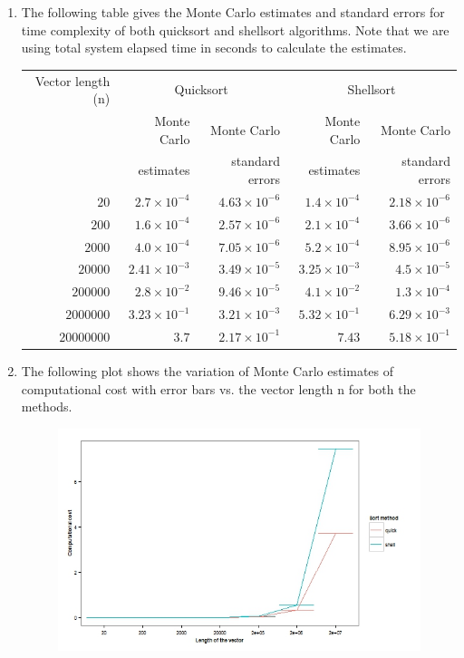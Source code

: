 \documentclass[12pt]{article}
\begin{document}
\begin{enumerate}[label=(\alph*)]
\item The following table gives the Monte Carlo estimates and standard errors for time complexity of both quicksort and shellsort algorithms. Note that we are using total system elapsed time in seconds to calculate the estimates. 
\FloatBarrier
\begin{table}[!htb]
\centering
\begin{tabular}{rrrrr}
  \hline
Vector length (n) & \multicolumn{2}{c}{Quicksort} & \multicolumn{2}{c}{Shellsort}\\ & Monte Carlo & Monte Carlo & Monte Carlo & Monte Carlo \\& estimates & standard errors & estimates & standard errors\\ 
  \hline
$20$ & $2.7\times 10^{-4}$ & $4.63\times 10^{-6}$ & $1.4\times 10^{-4}$ & $2.18\times 10^{-6}$ \\ 
$200$ & $1.6\times 10^{-4}$ & $2.57\times 10^{-6}$ & $2.1\times 10^{-4}$ & $3.66\times 10^{-6}$\\ 
$2000$ & $4.0\times 10^{-4}$ & $7.05\times 10^{-6}$ & $5.2\times 10^{-4}$ & $8.95\times 10^{-6}$\\ 
$20000$ & $2.41\times 10^{-3}$ & $3.49\times 10^{-5}$ & $3.25\times 10^{-3}$ & $4.5\times 10^{-5}$\\ 
$200000$ & $2.8\times 10^{-2}$ & $9.46\times 10^{-5}$ & $4.1\times 10^{-2}$ & $1.3\times 10^{-4}$\\ 
$2000000$ & $3.23\times 10^{-1}$ & $3.21\times 10^{-3}$ & $5.32\times 10^{-1}$ & $6.29\times 10^{-3}$\\
$20000000$ & $3.7$ & $2.17\times 10^{-1}$ & $7.43$ & $5.18\times 10^{-1}$\\ 
   \hline
\end{tabular}
\end{table}
\FloatBarrier
\item The following plot shows the variation of Monte Carlo estimates of computational cost with error bars vs. the vector length n for both the methods.
\begin{figure}[H]
\begin{centering}
\includegraphics[scale=0.6]{Fig4.jpeg}
\caption{}
\end{centering}
\end{figure}


\end{enumerate}
\end{document}
